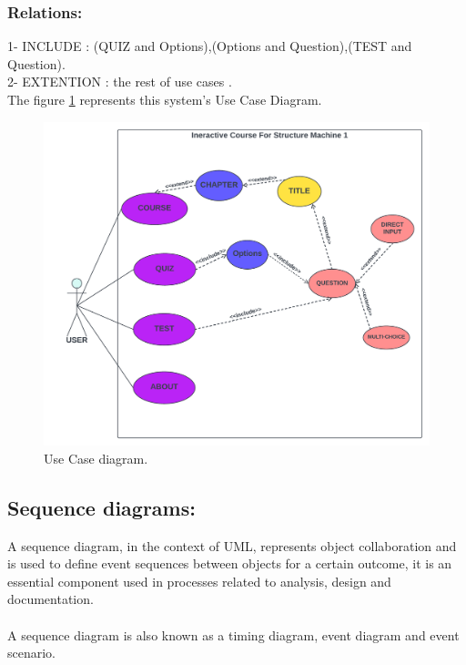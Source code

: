 \subsubsection{Relations:}
1- INCLUDE : (QUIZ and Options),(Options and Question),(TEST and Question).\\
2- EXTENTION : the rest of use cases .\\

The figure \ref{fig:UseCaseD} represents this system's Use Case Diagram.

\newpage
\begin{figure}[ht]
	\centering
	\label{}\includegraphics[scale=0.5]{img/Use Case.pdf}                
	\caption{Use Case diagram.} 
	\label{fig:UseCaseD}
\end{figure} 

\subsection{Sequence diagrams:}
A sequence diagram, in the context of UML, represents object collaboration and is used to define event sequences between objects for a certain outcome, it is an essential component used in processes related to analysis, design and documentation.\cite{Techopedia-DS} \\\\
A sequence diagram is also known as a timing diagram, event diagram and event scenario.\cite{Techopedia-DS}

